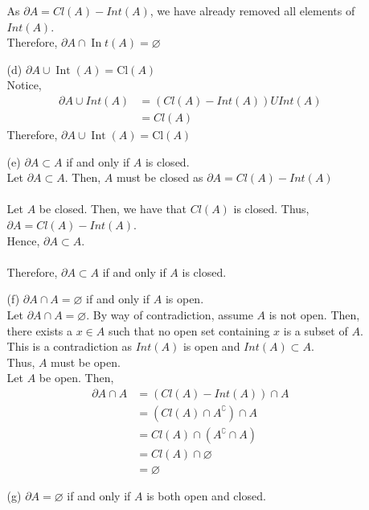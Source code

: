 \documentclass[12pt]{article}
\begin{document}
\begin{enumerate}
\begin{enumerate}
			As $ \partial A = Cl(A)-Int(A) $, we have already removed all elements of $ Int(A) $.\\
			Therefore,  $\partial A \cap \operatorname { In } t ( A ) = \varnothing$
			\item[(d)] $\partial A \cup \operatorname { Int } ( A ) = \mathrm { Cl } ( A )$\\
			Notice, 
			\begin{align*}
				\partial A \cup Int(A) &= (Cl(A) - Int(A)) U Int(A) \\
									   &= Cl(A)
			\end{align*}
			Therefore,  $\partial A \cup \operatorname { Int } ( A ) = \mathrm { Cl } ( A )$
			\item[(e)] $\partial A \subset A$ if and only if $A$ is closed.\\
			Let $ \partial A \subset A $. Then, $ A $ must be closed as $ \partial A = Cl(A) - Int(A) $\\
			\\
			Let $ A $ be closed. Then, we have that $ Cl(A) $ is closed. Thus, $ \partial A = Cl(A)- Int(A) $.\\
			Hence, $ \partial A \subset A $.\\
			\\
			Therefore,  $\partial A \subset A$ if and only if $A$ is closed.\\
			\item[(f)] $\partial A \cap A = \varnothing$ if and only if $A$ is open.\\
			Let $ \partial A \cap A = \varnothing $. By way of contradiction, assume $ A $ is not open. Then, there exists a $ x \in A $ such that no open set containing $ x $ is a subset of $ A $. This is a contradiction as $ Int(A) $ is open and $ Int(A)\subset A $.\\
			Thus, $ A $ must be open.\\
			Let $ A $ be open. Then, 
			\begin{align*}
			 \partial A \cap A &= (Cl(A) - Int(A)) \cap A\\
			 				   &= (Cl(A)\cap A^\complement) \cap A \\
			 				   &= Cl(A) \cap (A^\complement \cap A) \\
			 				   &= Cl(A) \cap \varnothing \\
			 				   &= \varnothing
			\end{align*}
			\item[(g)] $\partial A = \varnothing$ if and only if $A$ is both open and closed.\\

\end{enumerate}
\end{enumerate}
\end{document}
